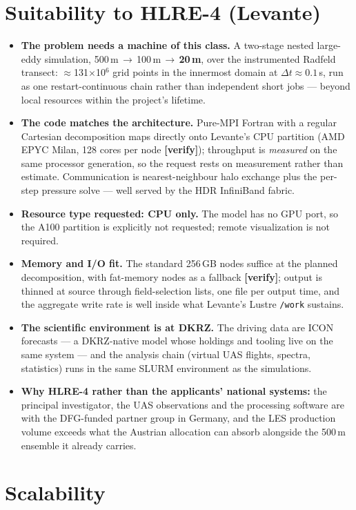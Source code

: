 \documentclass[10pt,a4paper]{article}
\newcommand{\ver}{\textbf{[verify]}}
\begin{document}
\section*{Suitability to HLRE-4 (Levante)}
\begin{itemize}
\item \textbf{The problem needs a machine of this class.} A two-stage nested
  large-eddy simulation, 500\,m\,$\to$\,100\,m\,$\to$\,\textbf{20\,m}, over the
  instrumented Radfeld transect: $\approx$131$\times$10$^6$ grid points in the
  innermost domain at $\Delta t \approx 0.1$\,s, run as one restart-continuous
  chain rather than independent short jobs --- beyond local resources within the
  project's lifetime.
\item \textbf{The code matches the architecture.} Pure-MPI Fortran with a
  regular Cartesian decomposition maps directly onto Levante's CPU partition
  (AMD EPYC Milan, 128 cores per node \ver); throughput is \emph{measured} on
  the same processor generation, so the request rests on measurement rather than
  estimate. Communication is nearest-neighbour halo exchange plus the per-step
  pressure solve --- well served by the HDR InfiniBand fabric.
\item \textbf{Resource type requested: CPU only.} The model has no GPU port, so
  the A100 partition is explicitly not requested; remote visualization is not
  required.
\item \textbf{Memory and I/O fit.} The standard 256\,GB nodes suffice at the
  planned decomposition, with fat-memory nodes as a fallback \ver; output is
  thinned at source through field-selection lists, one file per output time, and
  the aggregate write rate is well inside what Levante's Lustre \texttt{/work}
  sustains.
\item \textbf{The scientific environment is at DKRZ.} The driving data are ICON
  forecasts --- a DKRZ-native model whose holdings and tooling live on the same
  system --- and the analysis chain (virtual UAS flights, spectra, statistics)
  runs in the same SLURM environment as the simulations.
\item \textbf{Why HLRE-4 rather than the applicants' national systems:} the
  principal investigator, the UAS observations and the processing software are
  with the DFG-funded partner group in Germany, and the LES production volume
  exceeds what the Austrian allocation can absorb alongside the 500\,m ensemble
  it already carries.
\end{itemize}

\section*{Scalability}
\end{document}
